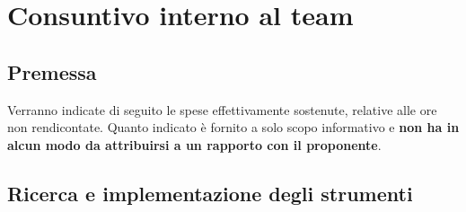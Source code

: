 %


\section{Consuntivo interno al team} %
\label{sec:consuntivo_interno_al_team}
	\subsection{Premessa} %
	\label{sub:premessa}
	Verranno indicate di seguito le spese effettivamente sostenute, relative alle ore non rendicontate. Quanto indicato è fornito a solo scopo informativo e \textbf{non ha in alcun modo da attribuirsi a un rapporto con il proponente}.

	\subsection{Ricerca e implementazione degli strumenti} %
	\label{sub:ricerca_e_implementazione_degli_strumenti}
